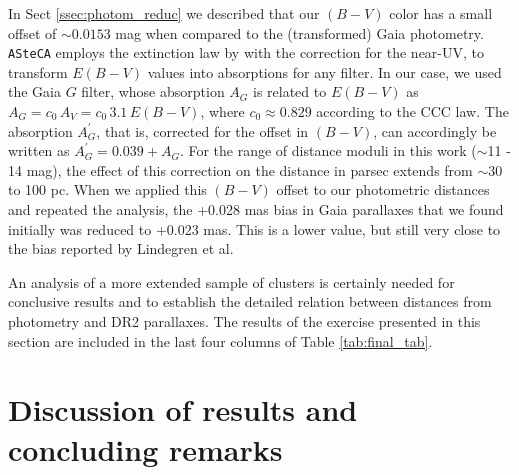\documentclass[draft]{aa}
\begin{document}
In Sect \ref{ssec:photom_reduc} we described that our $(B-V)$ color has a small
offset of $\sim0.0153$ mag when compared to the (transformed) Gaia photometry.
\texttt{ASteCA} employs the extinction law by \citet[][CCC law]{Cardelli_1989}
with the \citet{Odonnell_1994} correction for the near-UV, to transform $E
(B-V)$ values into absorptions for any filter.
In our case, we used the Gaia $G$ filter, whose absorption $A_G$ is related to $E
(B-V)$ as $A_G = c_0 \, A_V  = c_0 \, 3.1 \, E(B-V)$, where $c_0\approx0.829$
according to the CCC law. The absorption $A_{G}^{\prime}$, that is,
corrected for the offset in $(B-V)$, can accordingly be written as $A_{G}^
{\prime}=0.039+A_G$.
For the range of distance moduli in this work ($\sim$11 - 14 mag), the effect
of this correction on the distance in parsec extends from $\sim$30 to 100 pc.
When we applied this $(B-V)$ offset to our photometric distances and repeated the
analysis, the +0.028 mas bias in Gaia parallaxes that we found
initially was reduced to +0.023 mas. This is a lower value, but still very
close to the bias reported by Lindegren et al.

An analysis of a more extended sample of clusters is certainly needed for conclusive results and to establish the detailed relation between
distances from photometry and DR2 parallaxes. The results of the exercise
presented in this section are included in the last four columns of Table 
\ref{tab:final_tab}.




\section{Discussion of results and concluding remarks}
\label{sec:results_concl}
\end{document}

